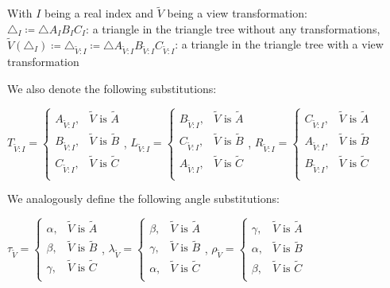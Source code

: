 \documentclass[a4paper,12pt]{article}
\newcommand{\HSview}[1][V]{\widetilde{#1}}
\newcommand{\HStriangle}[1][I]{\triangle_{\HSview:#1}}
\newcommand{\HSA}[1][I]{A_{\HSview:#1}}
\newcommand{\HSB}[1][I]{B_{\HSview:#1}}
\newcommand{\HSC}[1][I]{C_{\HSview:#1}}
\newcommand{\HST}[1][I]{T_{\HSview:#1}}
\newcommand{\HSL}[1][I]{L_{\HSview:#1}}
\newcommand{\HSR}[1][I]{R_{\HSview:#1}}
\theoremstyle{definition}
\theoremstyle{plain}
\begin{document}
	With $I$ being a real index and $\HSview$ being a view transformation:\\
	$\triangle_I \coloneqq \triangle A_I B_I C_I$: a triangle in the triangle tree without any transformations,\\
	$\HSview\left(\triangle_I\right) \coloneqq \HStriangle \coloneqq \triangle \HSA \HSB \HSC$: a triangle in the triangle tree with a view transformation

	We also denote the following substitutions:

	$\HST = \begin{cases}
		\HSA, & \HSview \text{ is } \HSview[A]\\
		\HSB, & \HSview \text{ is } \HSview[B]\\
		\HSC, & \HSview \text{ is } \HSview[C]\\
  \end{cases}$,\quad\quad
	$\HSL = \begin{cases}
		\HSB, & \HSview \text{ is } \HSview[A]\\
		\HSC, & \HSview \text{ is } \HSview[B]\\
		\HSA, & \HSview \text{ is } \HSview[C]\\
  \end{cases}$,\quad\quad
	$\HSR = \begin{cases}
		\HSC, & \HSview \text{ is } \HSview[A]\\
		\HSA, & \HSview \text{ is } \HSview[B]\\
		\HSB, & \HSview \text{ is } \HSview[C]\\
  \end{cases}$
	
	\pagebreak
	We analogously define the following angle substitutions:

	$\tau_{\HSview} = \begin{cases}
		\alpha, & \HSview \text{ is } \HSview[A]\\
		\beta, & \HSview \text{ is } \HSview[B]\\
		\gamma, & \HSview \text{ is } \HSview[C]\\
  \end{cases}$,\quad\quad
	$\lambda_{\HSview} = \begin{cases}
		\beta, & \HSview \text{ is } \HSview[A]\\
		\gamma, & \HSview \text{ is } \HSview[B]\\
		\alpha, & \HSview \text{ is } \HSview[C]\\
  \end{cases}$,\quad\quad
	$\rho_{\HSview} = \begin{cases}
		\gamma, & \HSview \text{ is } \HSview[A]\\
		\alpha, & \HSview \text{ is } \HSview[B]\\
		\beta, & \HSview \text{ is } \HSview[C]\\
  \end{cases}$
	
\end{document}
